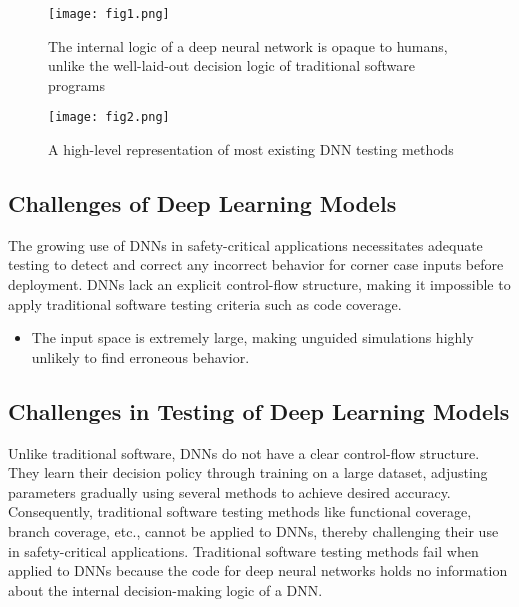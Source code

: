 \begin{figure*}[h]
	\centering
	\texttt{[image: fig1.png]}
	\caption{The internal logic of a deep neural network is opaque to humans, unlike the well-laid-out decision logic of traditional software programs \cite{Intro_1}}
	\label{fig:1}
\end{figure*}

\begin{figure*}[h]
	\centering
	\texttt{[image: fig2.png]}
	\caption{A high-level representation of most existing DNN testing methods \cite{Intro_1}}
	\label{fig:2}
\end{figure*}

\subsection{Challenges of Deep Learning Models}

The growing use of DNNs in safety-critical applications necessitates adequate testing to detect and correct any incorrect behavior for corner case inputs before deployment. DNNs lack an explicit control-flow structure, making it impossible to apply traditional software testing criteria such as code coverage.

\begin{itemize}
	\item The input space is extremely large, making unguided simulations highly unlikely to find erroneous behavior.
\end{itemize}

\subsection{Challenges in Testing of Deep Learning Models}

Unlike traditional software, DNNs do not have a clear control-flow structure. They learn their decision policy through training on a large dataset, adjusting parameters gradually using several methods to achieve desired accuracy. Consequently, traditional software testing methods like functional coverage, branch coverage, etc., cannot be applied to DNNs, thereby challenging their use in safety-critical applications. Traditional software testing methods fail when applied to DNNs because the code for deep neural networks holds no information about the internal decision-making logic of a DNN.

